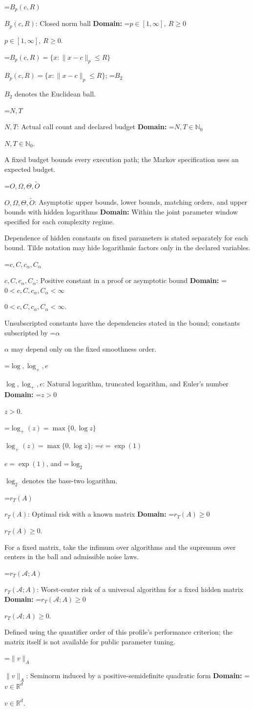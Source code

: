 \documentclass[10pt,a4paper]{article}
\newcommand{\AtlasMath}[1]{\par\begingroup\centering\setbox0=\hbox{$\displaystyle #1$}\ifdim\wd0>1.4\linewidth\typeout{ATLAS WIDE FORMULA: \the\wd0}\fi\ifdim\wd0>\linewidth\resizebox{\linewidth}{!}{\box0}\else\box0\fi\par\endgroup}
\newcommand{\AtlasInlineMath}[1]{\begingroup\setbox0=\hbox{$#1$}\ifdim\wd0>.4\linewidth\endgroup\AtlasMath{#1}\else\endgroup$#1$\fi}
\begin{document}
\AtlasInlineMath{B_p(c,R)}: Closed norm ball \textbf{Domain:} \AtlasInlineMath{p\in[1,\infty],\ R\ge0}.

\AtlasInlineMath{B_p(c,R)=\{x:\|x-c\|_p\le R\}}; \AtlasInlineMath{B_2} denotes the Euclidean ball.

\AtlasInlineMath{N,T}: Actual call count and declared budget \textbf{Domain:} \AtlasInlineMath{N,T\in\mathbb{N}_0}.

A fixed budget bounds every execution path; the Markov specification uses an expected budget.

\AtlasInlineMath{O,\Omega,\Theta,\widetilde{O}}: Asymptotic upper bounds, lower bounds, matching orders, and upper bounds with hidden logarithms \textbf{Domain:} Within the joint parameter window specified for each complexity regime.

Dependence of hidden constants on fixed parameters is stated separately for each bound. Tilde notation may hide logarithmic factors only in the declared variables.

\AtlasInlineMath{c,C,c_\alpha,C_\alpha}: Positive constant in a proof or asymptotic bound \textbf{Domain:} \AtlasInlineMath{0<c,C,c_\alpha,C_\alpha<\infty}.

Unsubscripted constants have the dependencies stated in the bound; constants subscripted by \AtlasInlineMath{\alpha} may depend only on the fixed smoothness order.

\AtlasInlineMath{\log,\log_+,e}: Natural logarithm, truncated logarithm, and Euler's number \textbf{Domain:} \AtlasInlineMath{z>0}.

\AtlasInlineMath{\log_+(z)=\max\{0,\log z\}}; \AtlasInlineMath{e=\exp(1)}, and \AtlasInlineMath{\log_2} denotes the base-two logarithm.

\AtlasInlineMath{r_T(A)}: Optimal risk with a known matrix \textbf{Domain:} \AtlasInlineMath{r_T(A)\ge0}.

For a fixed matrix, take the infimum over algorithms and the supremum over centers in the ball and admissible noise laws.

\AtlasInlineMath{r_T(\mathcal{A};A)}: Worst-center risk of a universal algorithm for a fixed hidden matrix \textbf{Domain:} \AtlasInlineMath{r_T(\mathcal{A};A)\ge0}.

Defined using the quantifier order of this profile's performance criterion; the matrix itself is not available for public parameter tuning.

\AtlasInlineMath{\|v\|_A}: Seminorm induced by a positive-semidefinite quadratic form \textbf{Domain:} \AtlasInlineMath{v\in\mathbb{R}^d}.
\end{document}
